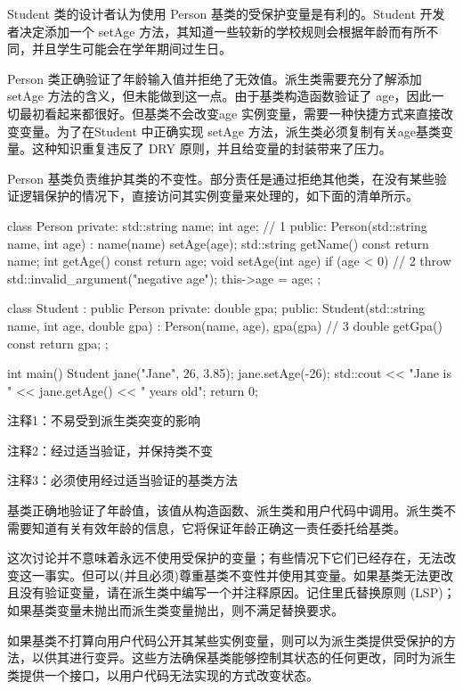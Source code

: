 Student 类的设计者认为使用 Person 基类的受保护变量是有利的。Student 开发者决定添加一个 setAge 方法，其知道一些较新的学校规则会根据年龄而有所不同，并且学生可能会在学年期间过生日。

Person 类正确验证了年龄输入值并拒绝了无效值。派生类需要充分了解添加 setAge 方法的含义，但未能做到这一点。由于基类构造函数验证了 age，因此一切最初看起来都很好。但基类不会改变age 实例变量，需要一种快捷方式来直接改变变量。为了在Student 中正确实现 setAge 方法，派生类必须复制有关age基类变量。这种知识重复违反了 DRY 原则，并且给变量的封装带来了压力。


Person 基类负责维护其类的不变性。部分责任是通过拒绝其他类，在没有某些验证逻辑保护的情况下，直接访问其实例变量来处理的，如下面的清单所示。


\begin{cpp}
class Person {
private:
  std::string name;
  int age; // 1
public:
  Person(std::string name, int age) : name(name) { setAge(age); }
  std::string getName() const { return name; }
  int getAge() const { return age; }
  void setAge(int age) {
    if (age < 0) // 2
      throw std::invalid_argument("negative age");
    this->age = age;
  }
};

class Student : public Person {
private:
  double gpa;
public:
  Student(std::string name, int age, double gpa) :
    Person(name, age), gpa(gpa) {} // 3
  double getGpa() const { return gpa; }
};

int main() {
  Student jane("Jane", 26, 3.85);
  jane.setAge(-26);
  std::cout << "Jane is " << jane.getAge() << " years old\n";
  return 0;
}
\end{cpp}

{\footnotesize
注释1：不易受到派生类突变的影响

注释2：经过适当验证，并保持类不变

注释3：必须使用经过适当验证的基类方法
}

基类正确地验证了年龄值，该值从构造函数、派生类和用户代码中调用。派生类不需要知道有关有效年龄的信息，它将保证年龄正确这一责任委托给基类。

这次讨论并不意味着永远不使用受保护的变量；有些情况下它们已经存在，无法改变这一事实。但可以(并且必须)尊重基类不变性并使用其变量。如果基类无法更改且没有验证变量，请在派生类中编写一个并注释原因。记住里氏替换原则 (LSP)；如果基类变量未抛出而派生类变量抛出，则不满足替换要求。

如果基类不打算向用户代码公开其某些实例变量，则可以为派生类提供受保护的方法，以供其进行变异。这些方法确保基类能够控制其状态的任何更改，同时为派生类提供一个接口，以用户代码无法实现的方式改变状态。

